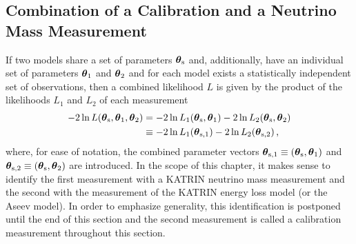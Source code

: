 \subsection{Combination of a Calibration and a Neutrino Mass Measurement}
\label{sec:katrinElossStatisticsCombMeasurements}
If two models share a set of parameters $\boldsymbol{\mathbf{\theta}}_\mathrm{s}$ and, additionally, have an individual set of parameters $\boldsymbol{\mathbf{\theta}}_1$ and $\boldsymbol{\mathbf{\theta}}_2$ and for each model exists a statistically independent set of observations, then a combined likelihood $L$ is given by the product of the likelihoods $L_1$ and $L_2$ of each measurement~\cite{ReviewOfParticlePhysics}
\newcommand{\paramVecSOne}{\paramVec_\mathrm{s,1}}
\newcommand{\paramVecSTwo}{\paramVec_\mathrm{s,2}}
\begin{align}
-2\ln L(\paramVecShared, \paramVec_1, \paramVec_2) &=  
-2\ln L_1(\paramVecShared, \paramVec_1)
-2\ln L_2(\paramVecShared, \paramVec_2)
\nonumber \\
&\equiv
-2\ln L_1(\paramVecSOne)
-2\ln L_2(\paramVecSTwo)
\label{eq:katrinElossStatisticsCombinedLikelihood}
\comma
\end{align}
where, for ease of notation, the combined parameter vectors $\boldsymbol{\mathbf{\theta}}_\mathrm{s,1}\equiv(\boldsymbol{\mathbf{\theta}}_\mathrm{s},\boldsymbol{\mathbf{\theta}}_1)$ and 
$\boldsymbol{\mathbf{\theta}}_\mathrm{s,2}\equiv(\boldsymbol{\mathbf{\theta}}_\mathrm{s},\boldsymbol{\mathbf{\theta}}_2)$ are introduced. In the scope of this chapter, it makes sense to identify the first measurement with a KATRIN neutrino mass measurement and the second with the measurement of the KATRIN energy loss model (or the Aseev model). In order to emphasize generality, this identification is postponed until the end of this section and the second measurement is called a calibration measurement throughout this section.

